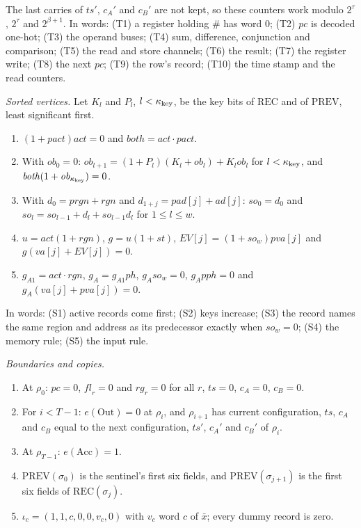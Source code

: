 \documentclass[11pt,letterpaper]{article}
\theoremstyle{definition}
\theoremstyle{remark}
\begin{document}
The last carries of \(\mathit{ts}'\), \(c_A'\) and \(c_B'\) are not
kept, so these counters work modulo \(2^\tau\), \(2^\tau\) and
\(2^{\beta+1}\). In words: (T1) a register holding \(\#\) has word
\(0\); (T2) \(\mathit{pc}\) is decoded one-hot; (T3) the operand buses;
(T4) sum, difference, conjunction and comparison; (T5) the read and
store channels; (T6) the result; (T7) the register write; (T8) the next
\(\mathit{pc}\); (T9) the row's record; (T10) the time stamp and the read
counters.

\emph{Sorted vertices.} Let \(K_l\) and \(P_l\), \(l<\kappa_{\rm key}\), be the key
bits of \(\mathrm{REC}\) and of \(\mathrm{PREV}\), least significant
first.
\begin{enumerate}[label=(S\arabic*)]
\item \((1+\mathit{pact})\mathit{act}=0\) and
\(\mathit{both}=\mathit{act}\cdot\mathit{pact}\).
\item With \(\mathit{ob}_0=0\):
\(\mathit{ob}_{l+1}=(1+P_l)(K_l+\mathit{ob}_l)+K_l\mathit{ob}_l\) for
\(l<\kappa_{\rm key}\), and \(\mathit{both}(1+\mathit{ob}_{\kappa_{\rm key}})=0\).
\item With \(d_0=\mathit{prgn}+\mathit{rgn}\) and
\(d_{1+j}=\mathit{pad}[j]+\mathit{ad}[j]\): \(\mathit{so}_0=d_0\) and
\(\mathit{so}_l=\mathit{so}_{l-1}+d_l+\mathit{so}_{l-1}d_l\) for
\(1\le l\le w\).
\item \(u=\mathit{act}(1+\mathit{rgn})\), \(g=u(1+\mathit{st})\),
\(\mathit{EV}[j]=(1+\mathit{so}_w)\mathit{pva}[j]\) and
\(g(\mathit{va}[j]+\mathit{EV}[j])=0\).
\item \(g_{A1}=\mathit{act}\cdot\mathit{rgn}\),
\(g_A=g_{A1}\mathit{ph}\), \(g_A\mathit{so}_w=0\),
\(g_A\mathit{pph}=0\) and \(g_A(\mathit{va}[j]+\mathit{pva}[j])=0\).
\end{enumerate}
In words: (S1) active records come first; (S2) keys increase; (S3) the
record names the same region and address as its predecessor exactly
when \(\mathit{so}_w=0\); (S4) the memory rule; (S5) the input rule.

\emph{Boundaries and copies.}
\begin{enumerate}[label=(B\arabic*)]
\item At \(\rho_0\): \(\mathit{pc}=0\), \(\mathit{fl}_r=0\) and
\(\mathit{rg}_r=0\) for all \(r\), \(\mathit{ts}=0\), \(c_A=0\),
\(c_B=0\).
\item For \(i<T-1\): \(e(\mathrm{Out})=0\) at \(\rho_i\), and
\(\rho_{i+1}\) has current configuration, \(\mathit{ts}\), \(c_A\) and
\(c_B\) equal to the next configuration, \(\mathit{ts}'\), \(c_A'\)
and \(c_B'\) of \(\rho_i\).
\item At \(\rho_{T-1}\): \(e(\mathrm{Acc})=1\).
\item \(\mathrm{PREV}(\sigma_0)\) is the sentinel's first six fields,
and \(\mathrm{PREV}(\sigma_{j+1})\) is the first six fields of
\(\mathrm{REC}(\sigma_j)\).
\item \(\iota_c=(1,1,c,0,0,v_c,0)\) with \(v_c\) word \(c\) of
\(\bar x\); every dummy record is zero.
\end{enumerate}
\end{document}
